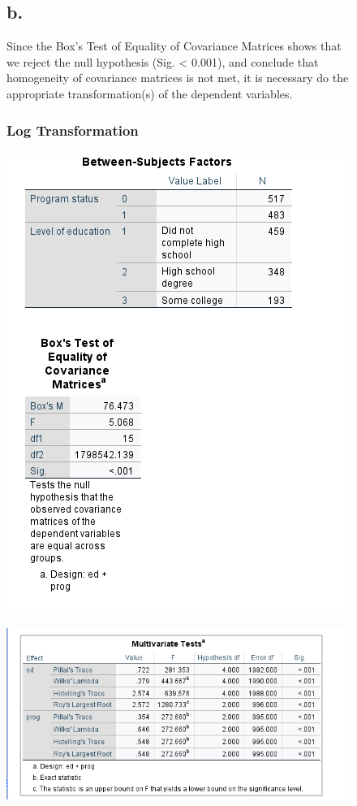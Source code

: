 \documentclass[english,10pt,a4paper]{article}
\begin{document}
	\begin{figure}[h]	
	\subsection*{b.} Since the Box's Test of Equality of Covariance Matrices shows that we reject the null hypothesis (Sig. < 0.001), and conclude that homogeneity of covariance matrices is not met, it is necessary do the appropriate transformation(s) of the dependent variables.
	
	\subsubsection*{Log Transformation}
		\includegraphics[width=0.8\linewidth]{Box's test1}
		
		
		\end{figure}
		
			\begin{figure}[h]
			
			
			\includegraphics[width=1\linewidth]{Multivariate test1}
		\end{figure}
		
\end{document}
